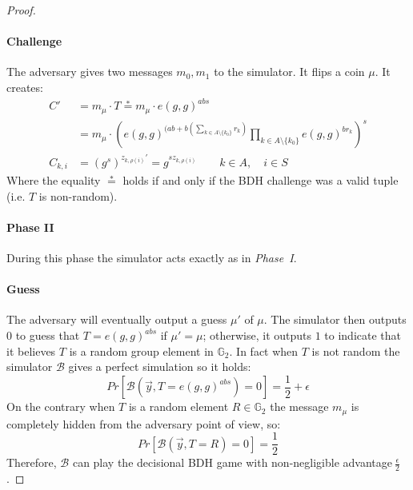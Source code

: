 \begin{proof}
    \paragraph*{Challenge}
      The adversary gives two messages $m_0, m_1$ to the simulator.
      It flips a coin $\mu$.
      It creates:
      \begin{align*}
        C' &= m_{\mu} \cdot T \stackrel{*}{=} m_{\mu} \cdot e(g,g)^{a b s} \\
        &=  m_{\mu} \cdot \left(e(g,g)^{(a b + b\left(\sum_{k \in A \setminus \{k_0\}} r_k\right)}\prod_{k \in A \setminus \{k_0\}} e(g,g)^{b r_k} \right)^s \nonumber \\
        C_{k,i} &= (g^s)^{z_{k, \rho(i)}'} = g^{s z_{k, \rho(i)}} \qquad k \in A, \quad i \in S
      \end{align*}
      Where the equality $\stackrel{*}{=}$ holds if and only if the BDH challenge was a valid tuple (i.e. $T$ is non-random).

    \paragraph*{Phase II}
      During this phase the simulator acts exactly as in \emph{Phase~I}.

    \paragraph*{Guess}
      The adversary will eventually output a guess $\mu'$ of $\mu$.
      The simulator then outputs $0$ to guess that $T = e(g, g)^{a b s}$ if $\mu' = \mu$; otherwise, it outputs $1$ to indicate that it believes $T$ is a random group element in $\mathbb{G}_2$.
      In fact when $T$ is not random the simulator $\mathcal{B}$ gives a perfect simulation so it holds:
      $$
        Pr\left[\mathcal{B}\left(\vec{y},T=e(g,g)^{a b s}\right)=0\right] = \frac{1}{2} + \epsilon
      $$
      On the contrary when $T$ is a random element $R \in \mathbb{G}_2$ the message $m_{\mu}$ is completely hidden from the adversary point of view, so:
      $$
        Pr\left[\mathcal{B}\left(\vec{y},T=R\right)=0\right] = \frac{1}{2}
      $$
      Therefore, $\mathcal{B}$ can play the decisional BDH game with non-negligible advantage$~\frac{\epsilon}{2}$.
  \end{proof}